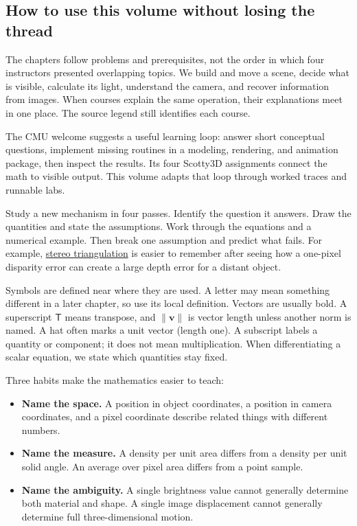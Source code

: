 \subsection{How to use this volume without losing the thread}\label{how-to-use-this-volume-without-losing-the-thread}

The chapters follow problems and prerequisites, not the order in which four instructors presented overlapping topics. We build and move a scene, decide what is visible, calculate its light, understand the camera, and recover information from images. When courses explain the same operation, their explanations meet in one place. The source legend still identifies each course.

The CMU welcome suggests a useful learning loop: answer short conceptual questions, implement missing routines in a modeling, rendering, and animation package, then inspect the results. Its four Scotty3D assignments connect the math to visible output. This volume adapts that loop through worked traces and runnable labs.

Study a new mechanism in four passes. Identify the question it answers. Draw the quantities and state the assumptions. Work through the equations and a numerical example. Then break one assumption and predict what fails. For example, \hyperref[appendix-c4e98b6e4001]{stereo triangulation} is easier to remember after seeing how a one-pixel disparity error can create a large depth error for a distant object.

Symbols are defined near where they are used. A letter may mean something different in a later chapter, so use its local definition. Vectors are usually bold. A superscript \(\mathsf T\) means transpose, and \(\|\mathbf v\|\) is vector length unless another norm is named. A hat often marks a unit vector (length one). A subscript labels a quantity or component; it does not mean multiplication. When differentiating a scalar equation, we state which quantities stay fixed.

Three habits make the mathematics easier to teach:

\begin{itemize}
\tightlist
\item
  \textbf{Name the space.} A position in object coordinates, a position in camera coordinates, and a pixel coordinate describe related things with different numbers.
\item
  \textbf{Name the measure.} A density per unit area differs from a density per unit solid angle. An average over pixel area differs from a point sample.
\item
  \textbf{Name the ambiguity.} A single brightness value cannot generally determine both material and shape. A single image displacement cannot generally determine full three-dimensional motion.
\end{itemize}

